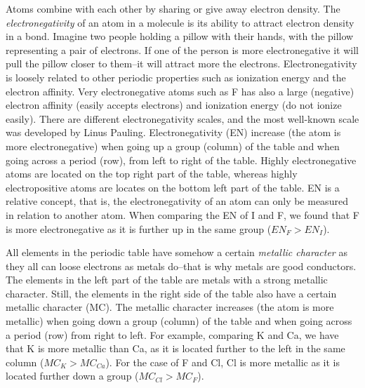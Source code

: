 \documentclass[main.tex]{subfiles}
\newcommand\chapterlabel{electrons}
\begin{document}
\begin{description}
\newpage






\item[\docfilehook{Electronegativity, EN}{}] 
Atoms combine with each other by sharing or give away electron density. The \emph{electronegativity} of an atom in a molecule is its ability to attract electron density in a bond. Imagine two people holding a pillow with their hands, with the pillow representing a pair of electrons. If one of the person is more electronegative it will pull the pillow closer to them--it will attract more the electrons. Electronegativity is loosely related to other periodic properties such as ionization energy and the electron affinity. Very electronegative atoms such as F has also a large (negative) electron affinity (easily accepts electrons) and ionization energy (do not ionize easily). There are different electronegativity scales, and the most well-known scale was developed by Linus Pauling. Electronegativity (EN) increase (the atom is more electronegative) when going up a group (column) of the table and when going across a period (row), from left to right of the table. Highly electronegative atoms are located on the top right part of the table, whereas highly electropositive atoms are locates on the bottom left part of the table. EN is a relative concept, that is, the electronegativity of an atom can only be measured in relation to another atom. When comparing the EN of I and F, we found that F is more electronegative as it is further up in the same group ($EN_{F}>EN_{I}$). 

\item[\docfilehook{Metallic character }{Metallic character }] 
All elements in the periodic table have somehow a certain \emph{metallic character} as they all can loose electrons as metals do--that is why metals are good conductors. The elements in the left part of the table are metals with a strong metallic character. Still, the elements in the right side of the table also have a certain metallic character (MC). The metallic character increases (the atom is more metallic) when going down a group (column) of the table and when going across a period (row) from right to left. For example, comparing K and Ca, we have that K is more metallic than Ca, as it is located further to the left in the same column ($MC_{K}>MC_{Ca}$). For the case of F and Cl, Cl is more metallic as it is located further down a group ($MC_{Cl}>MC_{F}$). 



\end{description}
\end{document}

